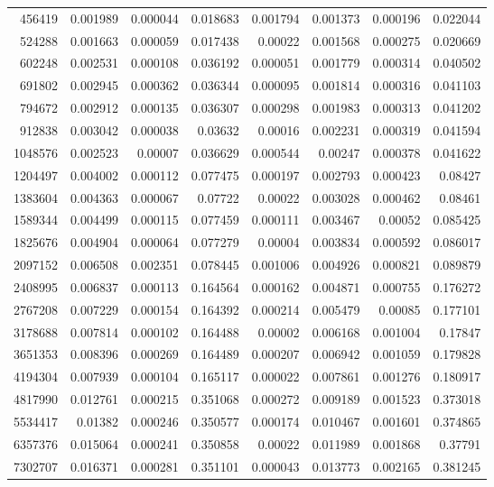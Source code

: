 \begin{longtable}{r r r r r r r r}
456419 & 0.001989 & 0.000044 & 0.018683 & 0.001794 & 0.001373 & 0.000196 & 0.022044 \\
524288 & 0.001663 & 0.000059 & 0.017438 & 0.00022 & 0.001568 & 0.000275 & 0.020669 \\
602248 & 0.002531 & 0.000108 & 0.036192 & 0.000051 & 0.001779 & 0.000314 & 0.040502 \\
691802 & 0.002945 & 0.000362 & 0.036344 & 0.000095 & 0.001814 & 0.000316 & 0.041103 \\
794672 & 0.002912 & 0.000135 & 0.036307 & 0.000298 & 0.001983 & 0.000313 & 0.041202 \\
912838 & 0.003042 & 0.000038 & 0.03632 & 0.00016 & 0.002231 & 0.000319 & 0.041594 \\
1048576 & 0.002523 & 0.00007 & 0.036629 & 0.000544 & 0.00247 & 0.000378 & 0.041622 \\
1204497 & 0.004002 & 0.000112 & 0.077475 & 0.000197 & 0.002793 & 0.000423 & 0.08427 \\
1383604 & 0.004363 & 0.000067 & 0.07722 & 0.00022 & 0.003028 & 0.000462 & 0.08461 \\
1589344 & 0.004499 & 0.000115 & 0.077459 & 0.000111 & 0.003467 & 0.00052 & 0.085425 \\
1825676 & 0.004904 & 0.000064 & 0.077279 & 0.00004 & 0.003834 & 0.000592 & 0.086017 \\
2097152 & 0.006508 & 0.002351 & 0.078445 & 0.001006 & 0.004926 & 0.000821 & 0.089879 \\
2408995 & 0.006837 & 0.000113 & 0.164564 & 0.000162 & 0.004871 & 0.000755 & 0.176272 \\
2767208 & 0.007229 & 0.000154 & 0.164392 & 0.000214 & 0.005479 & 0.00085 & 0.177101 \\
3178688 & 0.007814 & 0.000102 & 0.164488 & 0.00002 & 0.006168 & 0.001004 & 0.17847 \\
3651353 & 0.008396 & 0.000269 & 0.164489 & 0.000207 & 0.006942 & 0.001059 & 0.179828 \\
4194304 & 0.007939 & 0.000104 & 0.165117 & 0.000022 & 0.007861 & 0.001276 & 0.180917 \\
4817990 & 0.012761 & 0.000215 & 0.351068 & 0.000272 & 0.009189 & 0.001523 & 0.373018 \\
5534417 & 0.01382 & 0.000246 & 0.350577 & 0.000174 & 0.010467 & 0.001601 & 0.374865 \\
6357376 & 0.015064 & 0.000241 & 0.350858 & 0.00022 & 0.011989 & 0.001868 & 0.37791 \\
7302707 & 0.016371 & 0.000281 & 0.351101 & 0.000043 & 0.013773 & 0.002165 & 0.381245 \\

\end{longtable}
